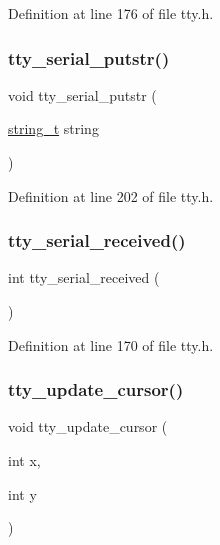 Definition at line 176 of file tty.\+h.

\mbox{\label{a00035_ab44a629b283c00c6d055049ac1e00275_ab44a629b283c00c6d055049ac1e00275}} 
\subsubsection{\texorpdfstring{tty\+\_\+serial\+\_\+putstr()}{tty\_serial\_putstr()}}
{\footnotesize\ttfamily void tty\+\_\+serial\+\_\+putstr (\begin{DoxyParamCaption}\item[{\hyperlink{a00029_ada436671bc57dfd805a9f3974c81e618_ada436671bc57dfd805a9f3974c81e618}{string\+\_\+t}}]{string }\end{DoxyParamCaption})}



Definition at line 202 of file tty.\+h.

\mbox{\label{a00035_ac3a6be4b1f86c89b946f286f6bb35444_ac3a6be4b1f86c89b946f286f6bb35444}} 
\subsubsection{\texorpdfstring{tty\+\_\+serial\+\_\+received()}{tty\_serial\_received()}}
{\footnotesize\ttfamily int tty\+\_\+serial\+\_\+received (\begin{DoxyParamCaption}{ }\end{DoxyParamCaption})}



Definition at line 170 of file tty.\+h.

\mbox{\label{a00035_a9ae91144ad89af8b8af856b611218d0c_a9ae91144ad89af8b8af856b611218d0c}} 
\subsubsection{\texorpdfstring{tty\+\_\+update\+\_\+cursor()}{tty\_update\_cursor()}}
{\footnotesize\ttfamily void tty\+\_\+update\+\_\+cursor (\begin{DoxyParamCaption}\item[{int}]{x,  }\item[{int}]{y }\end{DoxyParamCaption})}



